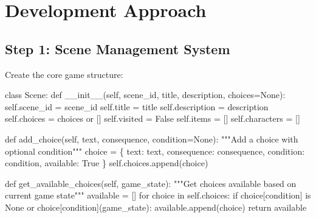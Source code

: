 \documentclass[
  letterpaper,
  DIV=11,
  numbers=noendperiod,
  oneside]{scrreprt}
\newenvironment{Shaded}{}{}
\newcommand{\CommentTok}[1]{\textcolor[rgb]{0.42,0.45,0.49}{#1}}
\newcommand{\ControlFlowTok}[1]{\textcolor[rgb]{0.84,0.23,0.29}{#1}}
\newcommand{\FunctionTok}[1]{\textcolor[rgb]{0.44,0.26,0.76}{#1}}
\newcommand{\KeywordTok}[1]{\textcolor[rgb]{0.84,0.23,0.29}{#1}}
\newcommand{\NormalTok}[1]{\textcolor[rgb]{0.14,0.16,0.18}{#1}}
\newcommand{\OperatorTok}[1]{\textcolor[rgb]{0.14,0.16,0.18}{#1}}
\newcommand{\StringTok}[1]{\textcolor[rgb]{0.01,0.18,0.38}{#1}}
\newcommand{\VariableTok}[1]{\textcolor[rgb]{0.89,0.38,0.04}{#1}}
\begin{document}
\section{Development Approach}\label{development-approach-10}

\subsection{Step 1: Scene Management
System}\label{step-1-scene-management-system}

Create the core game structure:

\begin{Shaded}
\begin{Highlighting}[]
\KeywordTok{class}\NormalTok{ Scene:}
    \KeywordTok{def} \FunctionTok{\_\_init\_\_}\NormalTok{(}\VariableTok{self}\NormalTok{, scene\_id, title, description, choices}\OperatorTok{=}\VariableTok{None}\NormalTok{):}
        \VariableTok{self}\NormalTok{.scene\_id }\OperatorTok{=}\NormalTok{ scene\_id}
        \VariableTok{self}\NormalTok{.title }\OperatorTok{=}\NormalTok{ title}
        \VariableTok{self}\NormalTok{.description }\OperatorTok{=}\NormalTok{ description}
        \VariableTok{self}\NormalTok{.choices }\OperatorTok{=}\NormalTok{ choices }\KeywordTok{or}\NormalTok{ []}
        \VariableTok{self}\NormalTok{.visited }\OperatorTok{=} \VariableTok{False}
        \VariableTok{self}\NormalTok{.items }\OperatorTok{=}\NormalTok{ []}
        \VariableTok{self}\NormalTok{.characters }\OperatorTok{=}\NormalTok{ []}
    
    \KeywordTok{def}\NormalTok{ add\_choice(}\VariableTok{self}\NormalTok{, text, consequence, condition}\OperatorTok{=}\VariableTok{None}\NormalTok{):}
        \CommentTok{"""Add a choice with optional condition"""}
\NormalTok{        choice }\OperatorTok{=}\NormalTok{ \{}
            \StringTok{\textquotesingle{}text\textquotesingle{}}\NormalTok{: text,}
            \StringTok{\textquotesingle{}consequence\textquotesingle{}}\NormalTok{: consequence,}
            \StringTok{\textquotesingle{}condition\textquotesingle{}}\NormalTok{: condition,}
            \StringTok{\textquotesingle{}available\textquotesingle{}}\NormalTok{: }\VariableTok{True}
\NormalTok{        \}}
        \VariableTok{self}\NormalTok{.choices.append(choice)}
    
    \KeywordTok{def}\NormalTok{ get\_available\_choices(}\VariableTok{self}\NormalTok{, game\_state):}
        \CommentTok{"""Get choices available based on current game state"""}
\NormalTok{        available }\OperatorTok{=}\NormalTok{ []}
        \ControlFlowTok{for}\NormalTok{ choice }\KeywordTok{in} \VariableTok{self}\NormalTok{.choices:}
            \ControlFlowTok{if}\NormalTok{ choice[}\StringTok{\textquotesingle{}condition\textquotesingle{}}\NormalTok{] }\KeywordTok{is} \VariableTok{None} \KeywordTok{or}\NormalTok{ choice[}\StringTok{\textquotesingle{}condition\textquotesingle{}}\NormalTok{](game\_state):}
\NormalTok{                available.append(choice)}
        \ControlFlowTok{return}\NormalTok{ available}


\end{Highlighting}
\end{Shaded}
\end{document}
